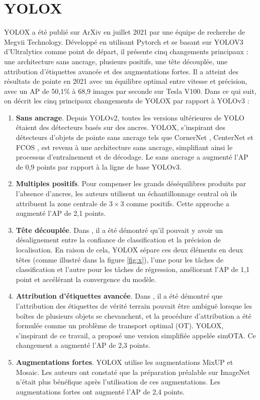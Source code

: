 \documentclass{article}
\begin{document}
\section{YOLOX}

YOLOX \cite{78} a été publié sur ArXiv en juillet 2021 par une équipe de recherche de Megvii Technology. Développé en utilisant Pytorch et se basant sur YOLOV3 d'Ultralytics comme point de départ, il présente cinq changements principaux : une architecture sans ancrage, plusieurs positifs, une tête découplée, une attribution d'étiquettes avancée et des augmentations fortes. Il a atteint des résultats de pointe en 2021 avec un équilibre optimal entre vitesse et précision, avec un AP de 50,1\% à 68,9 images par seconde sur Tesla V100. Dans ce qui suit, on décrit les cinq principaux changements de YOLOX par rapport à YOLOv3 :


\begin{enumerate}
    \item \textbf{Sans ancrage}. Depuis YOLOv2, toutes les versions ultérieures de YOLO étaient des détecteurs basés sur des ancres. YOLOX, s'inspirant des détecteurs d'objets de pointe sans ancrage tels que CornerNet \cite{79}, CenterNet \cite{80} et FCOS \cite{81}, est revenu à une architecture sans ancrage, simplifiant ainsi le processus d'entraînement et de décodage. Le sans ancrage a augmenté l'AP de 0,9 points par rapport à la ligne de base YOLOv3.
    \item \textbf{Multiples positifs}. Pour compenser les grands déséquilibres produits par l'absence d'ancres, les auteurs utilisent un échantillonnage central \cite{81} où ils attribuent la zone centrale de $3 \times 3$ comme positifs. Cette approche a augmenté l'AP de 2,1 points.
    \item \textbf{Tête découplée}. Dans \cite{82,83}, il a été démontré qu'il pouvait y avoir un désalignement entre la confiance de classification et la précision de localisation. En raison de cela, YOLOX sépare ces deux éléments en deux têtes (comme illustré dans la figure \ref{fig:x}), l'une pour les tâches de classification et l'autre pour les tâches de régression, améliorant l'AP de 1,1 point et accélérant la convergence du modèle.
    \item \textbf{Attribution d'étiquettes avancée}. Dans \cite{84}, il a été démontré que l'attribution des étiquettes de vérité terrain pouvait être ambiguë lorsque les boîtes de plusieurs objets se chevauchent, et la procédure d'attribution a été formulée comme un problème de transport optimal (OT). YOLOX, s'inspirant de ce travail, a proposé une version simplifiée appelée simOTA. Ce changement a augmenté l'AP de 2,3 points.
    \item \textbf{Augmentations fortes}. YOLOX utilise les augmentations MixUP \cite{85} et Mosaic. Les auteurs ont constaté que la préparation préalable sur ImageNet n'était plus bénéfique après l'utilisation de ces augmentations. Les augmentations fortes ont augmenté l'AP de 2,4 points.
\end{enumerate}
\end{document}
